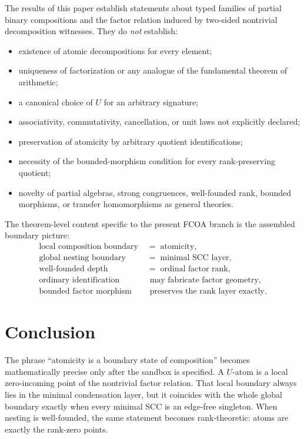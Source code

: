 \documentclass[11pt]{article}
\theoremstyle{definition}
\theoremstyle{remark}
\begin{document}
The results of this paper establish statements about typed families of partial binary compositions and the factor relation induced by two-sided nontrivial decomposition witnesses. They do \emph{not} establish:
\begin{itemize}
\item existence of atomic decompositions for every element;
\item uniqueness of factorization or any analogue of the fundamental theorem of arithmetic;
\item a canonical choice of \(U\) for an arbitrary signature;
\item associativity, commutativity, cancellation, or unit laws not explicitly declared;
\item preservation of atomicity by arbitrary quotient identifications;
\item necessity of the bounded-morphism condition for every rank-preserving quotient;
\item novelty of partial algebras, strong congruences, well-founded rank, bounded morphisms, or transfer homomorphisms as general theories.
\end{itemize}

The theorem-level content specific to the present FCOA branch is the assembled boundary picture:
\begin{equation}
\boxed{
\begin{aligned}
\text{local composition boundary} &\;=\; \text{atomicity},\\
\text{global nesting boundary} &\;=\; \text{minimal SCC layer},\\
\text{well-founded depth} &\;=\; \text{ordinal factor rank},\\
\text{ordinary identification} &\;\text{ may fabricate factor geometry},\\
\text{bounded factor morphism} &\;\text{ preserves the rank layer exactly}.
\end{aligned}}
\label{eq:synthesis}
\end{equation}

\section{Conclusion}

The phrase ``atomicity is a boundary state of composition'' becomes mathematically precise only after the sandbox is specified. A \(U\)-atom is a local zero-incoming point of the nontrivial factor relation. That local boundary always lies in the minimal condensation layer, but it coincides with the whole global boundary exactly when every minimal SCC is an edge-free singleton. When nesting is well-founded, the same statement becomes rank-theoretic: atoms are exactly the rank-zero points.
\end{document}
